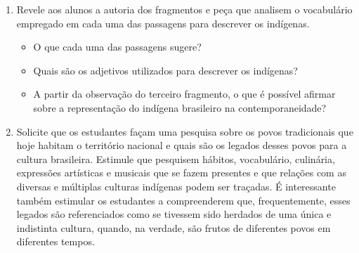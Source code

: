 \documentclass{extarticle}
\begin{document}
\begin{enumerate}
\begin{quote}
\begin{enumerate}
\setcounter{enumii}{2}
\item A feição deles é serem pardos, maneira de avermelhados, de bons
rostos e bons narizes, bem-feitos. Andam nus, sem nenhuma cobertura.
Nem estimam de cobrir ou de mostrar suas vergonhas; e nisso têm
tanta inocência como em mostrar o rosto. Ambos traziam os beiços de
baixo furados e metidos neles seus ossos brancos e verdadeiros, de
comprimento duma mão travessa, da grossura dum fuso de algodão,
agudos na ponta como um furador. Metem-nos pela parte de dentro do
beiço; e a parte que lhes fica entre o beiço e os dentes é feita
como roque de xadrez, ali encaixado de tal sorte que não os molesta,
nem os estorva no falar, no comer ou no beber {[}\ldots{}{]}\footnote{CAMINHA, Pero Vaz. \emph{A carta}. Disponível em:
\textless{}\href{http://www.dominiopublico.gov.br/pesquisa/DetalheObraForm.do?select_action=\&co_obra=17424}{\emph{http://www.dominiopublico.gov.br/pesquisa/DetalheObraForm.do?select\_action=\&co\_obra=17424}}\textgreater{},
acesso em 20 de fevereiro de 2021.}
\end{enumerate}
\end{quote}

A partir dessas três leituras, proponha uma reflexão sobre como são
retratados os indígenas, estimule que os alunos partilhem suas
experiências e conhecimentos acumulados. Chame a atenção para o
terceiro fragmento e pergunte a eles o que particulariza essa
descrição em contraponto às outras duas.

\item Revele aos alunos a autoria dos fragmentos e peça que analisem o
vocabulário empregado em cada uma das passagens para descrever os
indígenas.

\begin{itemize}
\item
  O que cada uma das passagens sugere?
\item
  Quais são os adjetivos utilizados para descrever os indígenas?
\item
  A partir da observação do terceiro fragmento, o que é possível afirmar
  sobre a representação do indígena brasileiro na contemporaneidade?
\end{itemize}

\item Solicite que os estudantes façam uma pesquisa sobre os povos
tradicionais que hoje habitam o território nacional e quais são os
legados desses povos para a cultura brasileira. Estimule que
pesquisem hábitos, vocabulário, culinária, expressões artísticas e
musicais que se fazem presentes e que relações com as diversas e
múltiplas culturas indígenas podem ser traçadas. É interessante
também estimular os estudantes a compreenderem que, frequentemente,
esses legados são referenciados como se tivessem sido herdados de
uma única e indistinta cultura, quando, na verdade, são frutos de
diferentes povos em diferentes tempos.
\end{enumerate}
\end{document}
